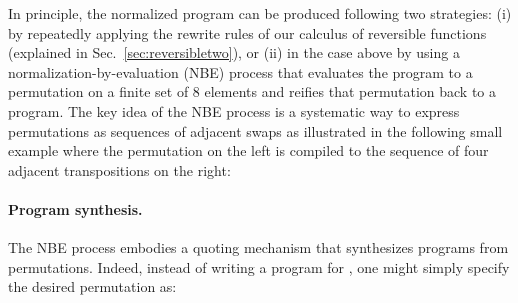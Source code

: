 In principle, the normalized program can be produced following two strategies: (i) by repeatedly applying the rewrite
rules of our calculus of reversible functions (explained in Sec.~\ref{sec:reversibletwo}), or (ii) in the case above by
using a normalization-by-evaluation (NBE) process that evaluates the program to a permutation on a finite set of 8
elements and reifies that permutation back to a program. The key idea of the NBE process is a systematic way to express
permutations as sequences of adjacent swaps as illustrated in the following small example where the permutation on the
left is compiled to the sequence of four adjacent transpositions on the right:



\paragraph*{Program synthesis.} The NBE process embodies a quoting mechanism that synthesizes programs from
permutations. Indeed, instead of writing a program for , one might simply specify the desired permutation as:

\resetperm{}

